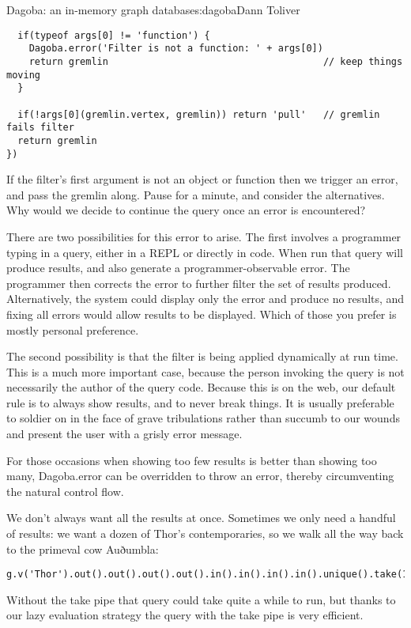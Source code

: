 \begin{aosachapter}{Dagoba: an in-memory graph database}{s:dagoba}{Dann Toliver}
\begin{verbatim}
  if(typeof args[0] != 'function') {
    Dagoba.error('Filter is not a function: ' + args[0]) 
    return gremlin                                      // keep things moving
  }

  if(!args[0](gremlin.vertex, gremlin)) return 'pull'   // gremlin fails filter 
  return gremlin
})
\end{verbatim}

If the filter's first argument is not an object or function then we
trigger an error, and pass the gremlin along. Pause for a minute, and
consider the alternatives. Why would we decide to continue the query
once an error is encountered?

There are two possibilities for this error to arise. The first involves
a programmer typing in a query, either in a REPL or directly in code.
When run that query will produce results, and also generate a
programmer-observable error. The programmer then corrects the error to
further filter the set of results produced. Alternatively, the system
could display only the error and produce no results, and fixing all
errors would allow results to be displayed. Which of those you prefer is
mostly personal preference.

The second possibility is that the filter is being applied dynamically
at run time. This is a much more important case, because the person
invoking the query is not necessarily the author of the query code.
Because this is on the web, our default rule is to always show results,
and to never break things. It is usually preferable to soldier on in the
face of grave tribulations rather than succumb to our wounds and present
the user with a grisly error message.

For those occasions when showing too few results is better than showing
too many, Dagoba.error can be overridden to throw an error, thereby
circumventing the natural control flow.

\label{take}

We don't always want all the results at once. Sometimes we only need a
handful of results: we want a dozen of Thor's contemporaries, so we walk
all the way back to the primeval cow Auðumbla:

\begin{verbatim}
g.v('Thor').out().out().out().out().in().in().in().in().unique().take(12).run()
\end{verbatim}

Without the take pipe that query could take quite a while to run, but
thanks to our lazy evaluation strategy the query with the take pipe is
very efficient.


\end{aosachapter}
